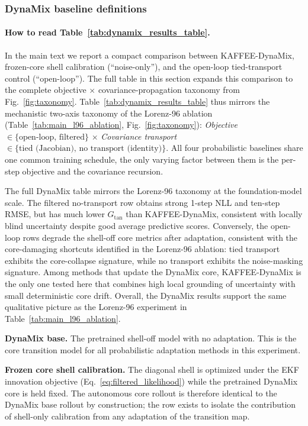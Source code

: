\documentclass{article}
\theoremstyle{plain}
\theoremstyle{definition}
\theoremstyle{remark}
\begin{document}
\subsubsection{DynaMix baseline definitions}
\label{app:dynamix_practical_baselines}

\paragraph{How to read Table~\ref{tab:dynamix_results_table}.} In the main text we report a compact comparison between KAFFEE-DynaMix, frozen-core
shell calibration (``noise-only''), and the open-loop tied-transport control (``open-loop''). The full table in this section expands this comparison to the complete objective $\times$ covariance-propagation taxonomy from Fig.~\ref{fig:taxonomy}. Table~\ref{tab:dynamix_results_table} thus mirrors the mechanistic two-axis taxonomy of the Lorenz-96 ablation (Table~\ref{tab:main_l96_ablation}, Fig.~\ref{fig:taxonomy}): \emph{Objective} $\in\{\text{open-loop},\,\text{filtered}\}$ $\times$ \emph{Covariance transport} $\in\{\text{tied (Jacobian)},\,\text{no transport (identity)}\}$. All four probabilistic baselines share one common training schedule, the only varying factor between them is the per-step objective and the covariance recursion.

The full DynaMix table mirrors the Lorenz-96 taxonomy at the foundation-model scale. The filtered no-transport row obtains strong 1-step NLL and ten-step RMSE, but has much lower $G_{\mathrm{tan}}$ than KAFFEE-DynaMix, consistent with locally blind uncertainty despite good average predictive scores. Conversely, the open-loop rows degrade the shell-off core metrics after adaptation, consistent with the core-damaging shortcuts identified in the Lorenz-96 ablation: tied transport exhibits the core-collapse signature, while no transport exhibits the noise-masking signature. Among methods that update the DynaMix core, KAFFEE-DynaMix is the only one tested here that combines high local grounding of uncertainty with small deterministic core drift. Overall, the DynaMix results support the same qualitative picture as the Lorenz-96 experiment in Table~\ref{tab:main_l96_ablation}.

\textbf{DynaMix base.} The pretrained shell-off model with no adaptation. This is the core transition model for all probabilistic adaptation methods in this experiment.

\textbf{Frozen core shell calibration.} The diagonal shell is optimized under the EKF innovation objective (Eq.~\ref{eq:filtered_likelihood}) while the pretrained DynaMix core is held fixed. The autonomous core rollout is therefore identical to the DynaMix base rollout by construction; the row exists to isolate the contribution of shell-only calibration from any adaptation of the transition map.
\end{document}
